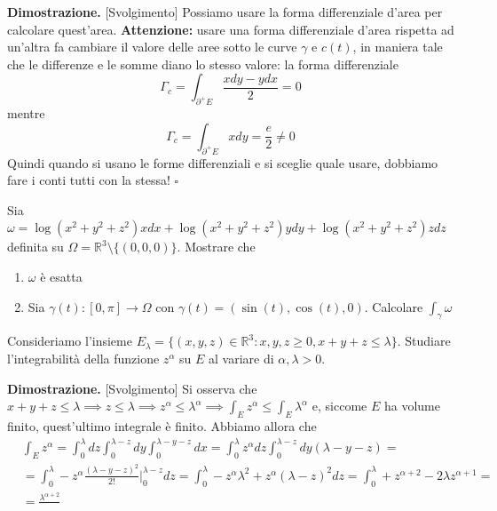 \noindent \textbf{Dimostrazione. } [Svolgimento]
	Possiamo usare la forma differenziale d'area per calcolare quest'area. \textbf{Attenzione:} usare una forma differenziale d'area rispetta ad un'altra fa cambiare il valore delle aree sotto le curve $\gamma$ e $c(t)$, in maniera tale che le differenze e le somme diano lo stesso valore: la forma differenziale
	$$
	\Gamma_c = \int_{\partial^{+} E} \frac{xdy - ydx}{2} = 0
	$$
	mentre
	$$
	\Gamma_c = \int_{\partial^{+} E} xdy = \frac{e}{2} \neq 0
	$$
	Quindi quando si usano le forme differenziali e si sceglie quale usare, dobbiamo fare i conti tutti con la stessa!
\hfill $\square$
\vspace{0.5cm}
\begin{exercise}
	Sia $\omega = \log(x^2 + y^2 + z^2)xdx + \log(x^2+y^2+z^2)ydy + \log(x^2+y^2+z^2)zdz$ definita su $\Omega = \mathbb{R}^3 \setminus \{(0, 0, 0)\}$. Mostrare che 
	\begin{enumerate}
		\item $\omega$ è esatta
		\item Sia $\gamma(t) : [0, \pi] \to \Omega$ con $\gamma(t) = (\sin(t), \cos(t), 0)$. Calcolare $\int_{\gamma} \omega$
	\end{enumerate}
\end{exercise}
%
\vspace{0.5cm}
\begin{exercise}
	Consideriamo l'insieme $E_\lambda = \{ (x, y, z) \in \mathbb{R}^3 : x, y, z \geq 0, x + y + z \leq \lambda \}$. Studiare l'integrabilità della funzione $z^{\alpha}$ su $E$ al variare di $\alpha, \lambda > 0$.
\end{exercise}
%
\noindent \textbf{Dimostrazione. } [Svolgimento]
	Si osserva che $x + y + z \leq \lambda \implies z \leq \lambda \implies z^{\alpha} \leq \lambda^{\alpha} \implies \int_E z^{\alpha} \leq \int_E \lambda^{\alpha}$ e, siccome $E$ ha volume finito, quest'ultimo integrale è finito. Abbiamo allora che
	\[\begin{aligned}
		&\int_E z^{\alpha} = \int_0^{\lambda} dz \int_0^{\lambda - z} dy \int_0^{\lambda - y - z} dx = \int_0^{\lambda} z^{\alpha} dz \int_0^{\lambda - z} dy (\lambda - y - z) = \\
		&=\int_0^{\lambda} - z^{\alpha}\frac{(\lambda - y - z)^2}{2!}|^{\lambda - z}_0 dz = \int_0^{\lambda} - z^{\alpha} \lambda^2 + z^{\alpha}(\lambda - z)^2 dz = \int_0^{\lambda} + z^{\alpha + 2} - 2\lambda z^{\alpha + 1} = \\
		&=\frac{\lambda^{\alpha + 2}}{}
	\end{aligned}\]
